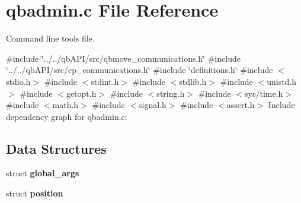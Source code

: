 \section{qbadmin.\+c File Reference}
\label{qbadmin_8c}


Command line tools file.  


{\ttfamily \#include \char`\"{}../../qb\+A\+P\+I/src/qbmove\+\_\+communications.\+h\char`\"{}}\newline
{\ttfamily \#include \char`\"{}../../qb\+A\+P\+I/src/cp\+\_\+communications.\+h\char`\"{}}\newline
{\ttfamily \#include \char`\"{}definitions.\+h\char`\"{}}\newline
{\ttfamily \#include $<$stdio.\+h$>$}\newline
{\ttfamily \#include $<$stdint.\+h$>$}\newline
{\ttfamily \#include $<$stdlib.\+h$>$}\newline
{\ttfamily \#include $<$unistd.\+h$>$}\newline
{\ttfamily \#include $<$getopt.\+h$>$}\newline
{\ttfamily \#include $<$string.\+h$>$}\newline
{\ttfamily \#include $<$sys/time.\+h$>$}\newline
{\ttfamily \#include $<$math.\+h$>$}\newline
{\ttfamily \#include $<$signal.\+h$>$}\newline
{\ttfamily \#include $<$assert.\+h$>$}\newline
Include dependency graph for qbadmin.\+c\+:
\subsection*{Data Structures}
\begin{DoxyCompactItemize}
\item 
struct \textbf{ global\+\_\+args}
\item 
struct \textbf{ position}
\end{DoxyCompactItemize}
